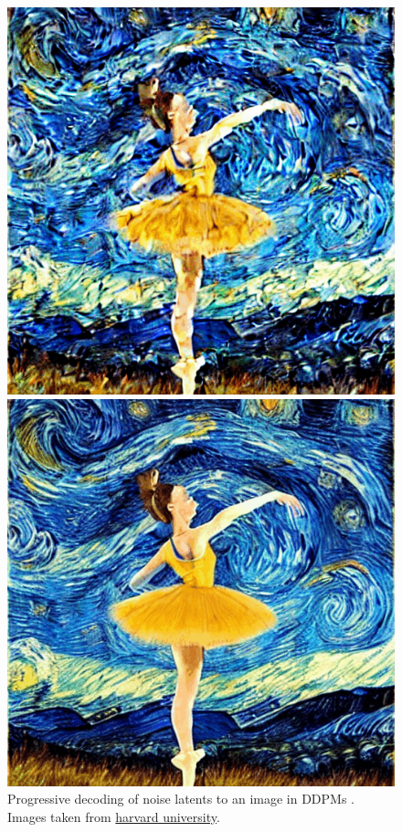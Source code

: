 \begin{figure}[h]
\begin{minipage}{0.10\textwidth}
    \end{minipage}
    \begin{minipage}{0.10\textwidth}
        \centering
        \includegraphics[width=\textwidth]{images/diffusion_models/noise_to_image_gif/6.png}
    \end{minipage}
    \begin{minipage}{0.10\textwidth}
        \centering
        \includegraphics[width=\textwidth]{images/diffusion_models/noise_to_image_gif/7.png}
    \end{minipage}
    \caption{Progressive decoding of noise latents to an image in DDPMs \cite{ddpm}. Images taken from \href{https://scholar.harvard.edu/binxuw/classes/machine-learning-scratch/materials/stable-diffusion-scratch}{harvard university}.}
\end{figure}
